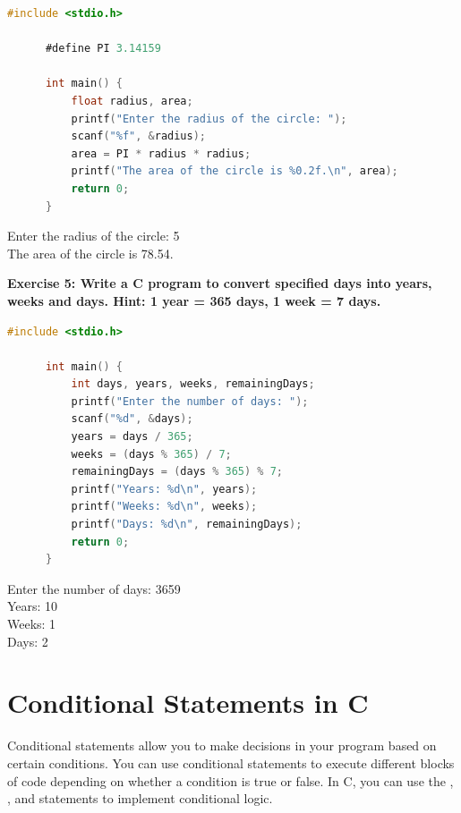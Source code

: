 \documentclass[12pt, openany]{book}
\begin{document}
  \begin{lstlisting}[language=C, caption=Solution to Exercise 4]
      #include <stdio.h>
      
      #define PI 3.14159
      
      int main() {
          float radius, area;
          printf("Enter the radius of the circle: ");
          scanf("%f", &radius);
          area = PI * radius * radius;
          printf("The area of the circle is %0.2f.\n", area);
          return 0;
      }
  \end{lstlisting}
  \begin{tcolorbox}[colback=lightgray!10, colframe=black, title=Output]
      Enter the radius of the circle: 5 \\
      The area of the circle is 78.54.
  \end{tcolorbox}
  \vspace{10pt}
  \noindent\textbf{Exercise 5: Write a C program to convert specified days into years, weeks and days. Hint: 1 year = 365 days, 1 week = 7 days.}
  
  \begin{lstlisting}[language=C, caption=Solution to Exercise 5]
      #include <stdio.h>
      
      int main() {
          int days, years, weeks, remainingDays;
          printf("Enter the number of days: ");
          scanf("%d", &days);
          years = days / 365;
          weeks = (days % 365) / 7;
          remainingDays = (days % 365) % 7;
          printf("Years: %d\n", years);
          printf("Weeks: %d\n", weeks);
          printf("Days: %d\n", remainingDays);
          return 0;
      }
  \end{lstlisting}
  \begin{tcolorbox}[colback=lightgray!10, colframe=black, title=Output]
      Enter the number of days: 3659 \\
      Years: 10 \\
      Weeks: 1 \\
      Days: 2
  \end{tcolorbox}
  
  \chapter{Conditional Statements in C}
  Conditional statements allow you to make decisions in your program based on certain conditions. You can use conditional statements to execute different blocks of code depending on whether a condition is true or false. In C, you can use the , , and  statements to implement conditional logic.
  
\end{document}
